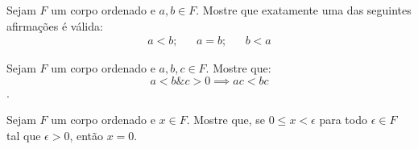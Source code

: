 \begin{exercise}
    Sejam $F$ um corpo ordenado e $a,b \in F$.
    Mostre que exatamente uma das seguintes afirmações é válida:
    \begin{align*}
        a<b; && a=b; && b<a
    \end{align*}
\end{exercise}

\begin{exercise}
    Sejam $F$ um corpo ordenado e $a,b,c \in F$.
    Mostre que:
    $$a < b \mathrel{\&} c > 0 \implies ac < bc$$.
\end{exercise}

\begin{exercise}
    Sejam $F$ um corpo ordenado e $x \in F$.
    Mostre que, se $0 \le x < \epsilon$ para todo $\epsilon \in F$ tal que $\epsilon > 0$, então $x=0$.
\end{exercise}